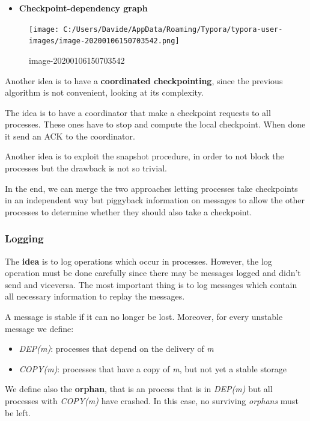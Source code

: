 \begin{itemize}
\itemsep1pt\parskip0pt
\item
  \textbf{Checkpoint-dependency graph}
\end{itemize}

\begin{figure}[htbp]
\centering
\texttt{[image: C:/Users/Davide/AppData/Roaming/Typora/typora-user-images/image-20200106150703542.png]}
\caption{image-20200106150703542}
\end{figure}

Another idea is to have a \textbf{coordinated checkpointing}, since the
previous algorithm is not convenient, looking at its complexity.

The idea is to have a coordinator that make a checkpoint requests to all
processes. These ones have to stop and compute the local checkpoint.
When done it send an ACK to the coordinator.

Another idea is to exploit the snapshot procedure, in order to not block
the processes but the drawback is not so trivial.

In the end, we can merge the two approaches letting processes take
checkpoints in an independent way but piggyback information on messages
to allow the other processes to determine whether they should also take
a checkpoint.

\subsubsection{Logging}\label{logging}

The \textbf{idea} is to log operations which occur in processes.
However, the log operation must be done carefully since there may be
messages logged and didn't send and viceversa. The most important thing
is to log messages which contain all necessary information to replay the
messages.

A message is stable if it can no longer be lost. Moreover, for every
unstable message we define:

\begin{itemize}
\itemsep1pt\parskip0pt
\item
  \emph{DEP(m)}: processes that depend on the delivery of \emph{m}
\item
  \emph{COPY(m)}: processes that have a copy of \emph{m}, but not yet a
  stable storage
\end{itemize}

We define also the \textbf{orphan}, that is an process that is in
\emph{DEP(m)} but all processes with \emph{COPY(m)} have crashed. In
this case, no surviving \emph{orphans} must be left.

